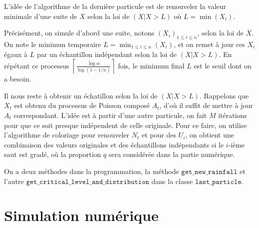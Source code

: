 \documentclass{article}
\begin{document}
L'idée de l'algorithme de la dernière particule est de renouveler la valeur minimale d'une suite de $X$ selon la loi de $(X|X>L)$ où $L=\min(X_i)$. 

Précisément, on simule d'abord une suite, notons $(X_i)_{1\leq i\leq n}$, selon la loi de $X$. On note le minimun temporaire $L=\min_{1\leq i\leq n}(X_i)$, et on remet à jour ces $X_i$ égaux à $L$ par un échantillon indépendant selon la loi de $(X|X>L)$. En répétant ce processus $\displaystyle \left\lceil\frac{\log \alpha}{\log(1-1/n)}\right\rceil$ fois, le minimum final $L$ est le seuil dont on a besoin.

Il nous reste à obtenir un échatillon selon la loi de $(X|X>L)$. Rappelons que $X_t$ est obtenu du processus de Poisson composé $A_t$, d'où il suffit de mettre à jour $A_t$ correspondant. L'idée est à partir d'une autre particule, on fait $M$ itérations pour que ce soit presque indépendent de celle originale. Pour ce faire, on utilise l'algorithme de coloriage pour renouveler $N_t$ et pour des $U_i$, on obtient une combinaison des valeurs originales et des échantillons indépendants si le $i$-ième saut est gradé, où la proportion $q$ sera considérée dans la partie numérique.

On a deux méthodes dans la programmation, la méthode $\texttt{get\_new\_rainfall}$ et l'autre $\texttt{get\_critical\_level\_and\_distribution}$ dans la classe $\texttt{last\_particle}$.

\section{Simulation numérique} 
\end{document}
